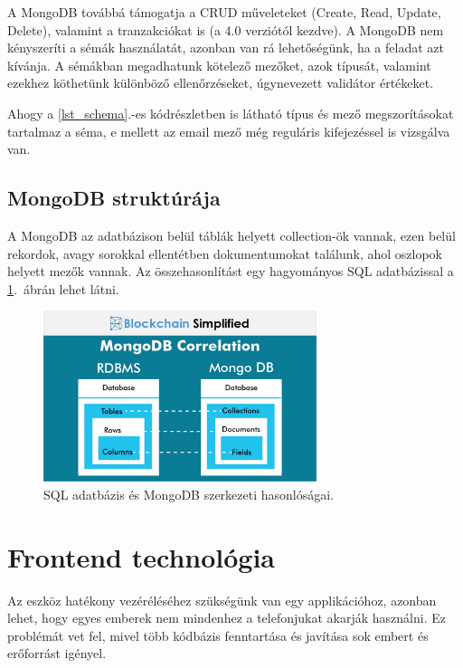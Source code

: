 \documentclass{thesis-ekf}
\theoremstyle{definition}
\theoremstyle{remark}
\begin{document}
	A MongoDB továbbá támogatja a CRUD műveleteket (Create, Read, Update, Delete), valamint a tranzakciókat is (a 4.0 verziótól kezdve).\cite{bib_mongo_sql}
	A MongoDB nem kényszeríti a sémák használatát, azonban van rá lehetőségünk, ha a feladat azt kívánja. A sémákban megadhatunk kötelező mezőket, azok típusát, valamint ezekhez köthetünk különböző ellenőrzéseket, úgynevezett validátor értékeket.
	
	
	Ahogy a \ref{lst_schema}.-es kódrészletben is látható típus és mező megszorításokat tartalmaz a séma, e mellett az email mező még reguláris kifejezéssel is vizsgálva van.
	\subsection{MongoDB struktúrája}
	A MongoDB az adatbázison belül táblák helyett collection-ök vannak, ezen belül rekordok, avagy sorokkal ellentétben dokumentumokat találunk, ahol oszlopok helyett mezők vannak. Az összehasonlítást egy hagyományos SQL adatbázissal a \ref{img_sql_mongo}.~ábrán lehet látni. \cite{bib_mongo_sql}
	 \begin{figure}[!h]
	 	\centering
	 	\includegraphics[width=8cm]{mongo_vs_sql}
	 	\caption{SQL adatbázis és MongoDB szerkezeti hasonlóságai.\cite{bib_mongo_sql}}
	 	\label{img_sql_mongo}
	 \end{figure}
	\section{Frontend technológia}
	Az eszköz hatékony vezéréléséhez szükségünk van egy applikációhoz, azonban lehet, hogy egyes emberek nem mindenhez a telefonjukat akarják használni. Ez problémát vet fel, mivel több kódbázis fenntartása és javítása sok embert és erőforrást igényel. 
	
\end{document}
